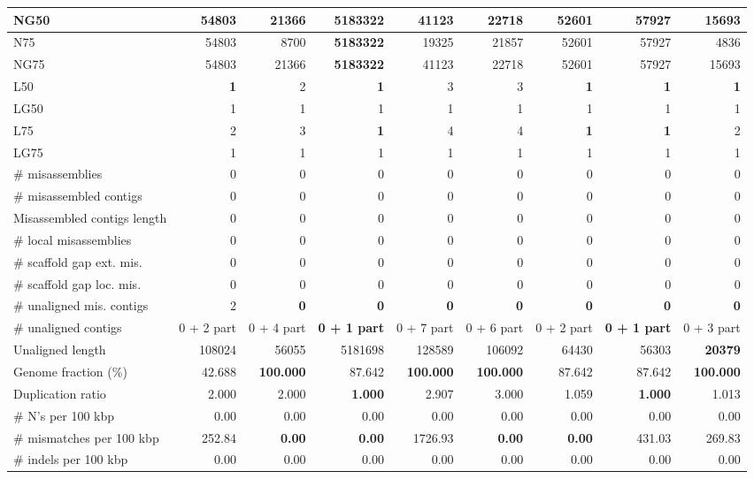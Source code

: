 \documentclass[12pt,a4paper]{article}
\begin{document}
\begin{table}[ht]
\begin{center}
\begin{tabular}{|l*{8}{|r}|}
NG50 & 54803 & 21366 & {\bf 5183322} & 41123 & 22718 & 52601 & 57927 & 15693 \\ \hline
N75 & 54803 & 8700 & {\bf 5183322} & 19325 & 21857 & 52601 & 57927 & 4836 \\ \hline
NG75 & 54803 & 21366 & {\bf 5183322} & 41123 & 22718 & 52601 & 57927 & 15693 \\ \hline
L50 & {\bf 1} & 2 & {\bf 1} & 3 & 3 & {\bf 1} & {\bf 1} & {\bf 1} \\ \hline
LG50 & 1 & 1 & 1 & 1 & 1 & 1 & 1 & 1 \\ \hline
L75 & 2 & 3 & {\bf 1} & 4 & 4 & {\bf 1} & {\bf 1} & 2 \\ \hline
LG75 & 1 & 1 & 1 & 1 & 1 & 1 & 1 & 1 \\ \hline
\# misassemblies & 0 & 0 & 0 & 0 & 0 & 0 & 0 & 0 \\ \hline
\# misassembled contigs & 0 & 0 & 0 & 0 & 0 & 0 & 0 & 0 \\ \hline
Misassembled contigs length & 0 & 0 & 0 & 0 & 0 & 0 & 0 & 0 \\ \hline
\# local misassemblies & 0 & 0 & 0 & 0 & 0 & 0 & 0 & 0 \\ \hline
\# scaffold gap ext. mis. & 0 & 0 & 0 & 0 & 0 & 0 & 0 & 0 \\ \hline
\# scaffold gap loc. mis. & 0 & 0 & 0 & 0 & 0 & 0 & 0 & 0 \\ \hline
\# unaligned mis. contigs & 2 & {\bf 0} & {\bf 0} & {\bf 0} & {\bf 0} & {\bf 0} & {\bf 0} & {\bf 0} \\ \hline
\# unaligned contigs & 0 + 2 part & 0 + 4 part & {\bf 0 + 1 part} & 0 + 7 part & 0 + 6 part & 0 + 2 part & {\bf 0 + 1 part} & 0 + 3 part \\ \hline
Unaligned length & 108024 & 56055 & 5181698 & 128589 & 106092 & 64430 & 56303 & {\bf 20379} \\ \hline
Genome fraction (\%) & 42.688 & {\bf 100.000} & 87.642 & {\bf 100.000} & {\bf 100.000} & 87.642 & 87.642 & {\bf 100.000} \\ \hline
Duplication ratio & 2.000 & 2.000 & {\bf 1.000} & 2.907 & 3.000 & 1.059 & {\bf 1.000} & 1.013 \\ \hline
\# N's per 100 kbp & 0.00 & 0.00 & 0.00 & 0.00 & 0.00 & 0.00 & 0.00 & 0.00 \\ \hline
\# mismatches per 100 kbp & 252.84 & {\bf 0.00} & {\bf 0.00} & 1726.93 & {\bf 0.00} & {\bf 0.00} & 431.03 & 269.83 \\ \hline
\# indels per 100 kbp & 0.00 & 0.00 & 0.00 & 0.00 & 0.00 & 0.00 & 0.00 & 0.00 \\ \hline

\end{tabular}
\end{center}
\end{table}
\end{document}
